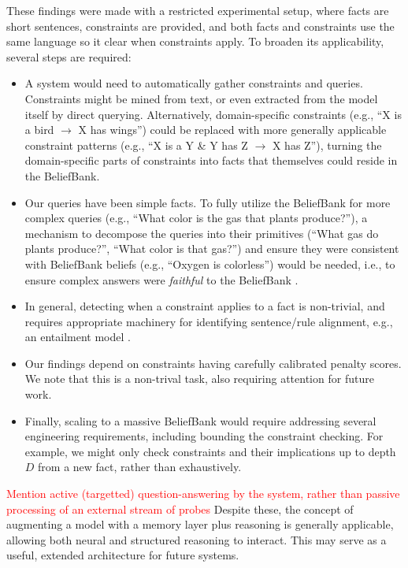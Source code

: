 \documentclass[11pt]{article}
\newcommand{\red}[1]{\textcolor{red}{#1}}
\newenvironment{ite}{                     %
     \parskip 0cm \begin{itemize} \parskip 0cm \parsep 0cm \itemsep 0cm \topsep 0cm}{
        \end{itemize}} %
\begin{document}
These findings were made with a restricted experimental setup,  where facts are short sentences, constraints are provided, and both facts and constraints use the same language so it clear when constraints apply. To broaden its applicability, several steps are required:
\begin{ite}
\item
A system would need to automatically gather constraints and queries.
Constraints might be mined from text, or even extracted from the model itself by direct querying. Alternatively, domain-specific constraints (e.g., ``X is a bird $\rightarrow$ X has wings'') could be replaced with more generally applicable constraint patterns
(e.g., ``X is a Y \& Y has Z $\rightarrow$ X has Z''), turning the domain-specific parts of constraints into facts that
themselves could reside in the BeliefBank.
\item Our queries have been simple facts. To fully utilize the BeliefBank for more complex
queries (e.g., ``What color is the gas that plants produce?''), a mechanism to decompose the queries
into their primitives (``What gas do plants produce?'', ``What color is that gas?'') and ensure they were
consistent with BeliefBank beliefs (e.g., ``Oxygen is colorless'') would be needed, i.e., to ensure complex answers were {\it faithful} to the BeliefBank \cite{Subramanian2020ObtainingFI}.
\item In general, detecting when a constraint applies to a fact is non-trivial, and requires appropriate machinery for
identifying sentence/rule alignment, e.g., an entailment model \cite{Seo2017BidirectionalAF}.
\item Our findings depend on constraints having carefully calibrated penalty scores. We note that this
is a non-trival task, also requiring attention for future work.
\item Finally, scaling to a massive BeliefBank would require addressing several engineering requirements,
including bounding the constraint checking. For example, we might only check constraints
and their implications up to depth $D$ from a new fact, rather than exhaustively.
\end{ite}
\red{Mention active (targetted) question-answering by the system, rather than passive processing of an external stream of probes}
Despite these, the concept of augmenting a model with a memory layer plus reasoning is generally applicable,
allowing both neural and structured reasoning to interact. This may serve as a useful, extended architecture
for future systems.
\end{document}
